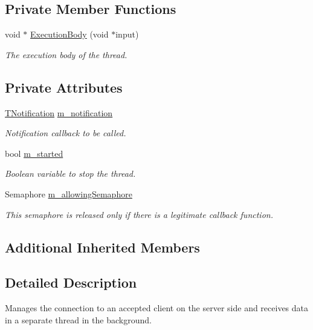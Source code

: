 \subsection*{Private Member Functions}
\begin{DoxyCompactItemize}
\item 
void $\ast$ \hyperlink{class_threaded_t_c_p_connected_client_a019445fcc5fc83ad40583d3772c88a8b}{Execution\-Body} (void $\ast$input)
\begin{DoxyCompactList}\small\item\em The execution body of the thread. \end{DoxyCompactList}\end{DoxyCompactItemize}
\subsection*{Private Attributes}
\begin{DoxyCompactItemize}
\item 
\hyperlink{class_threaded_t_c_p_connected_client_a0b2385571a0d98483ddc7ca84bc82cf4}{T\-Notification} \hyperlink{class_threaded_t_c_p_connected_client_a2e4475f9a13d5cfbc34c28449789ef25}{m\-\_\-notification}
\begin{DoxyCompactList}\small\item\em Notification callback to be called. \end{DoxyCompactList}\item 
bool \hyperlink{class_threaded_t_c_p_connected_client_ada47374bbca328b7eb6f187af10b32a0}{m\-\_\-started}
\begin{DoxyCompactList}\small\item\em Boolean variable to stop the thread. \end{DoxyCompactList}\item 
Semaphore \hyperlink{class_threaded_t_c_p_connected_client_a30dd0658adca73cf964dda1b9788f94c}{m\-\_\-allowing\-Semaphore}
\begin{DoxyCompactList}\small\item\em This semaphore is released only if there is a legitimate callback function. \end{DoxyCompactList}\end{DoxyCompactItemize}
\subsection*{Additional Inherited Members}


\subsection{Detailed Description}
Manages the connection to an accepted client on the server side and receives data in a separate thread in the background. 

